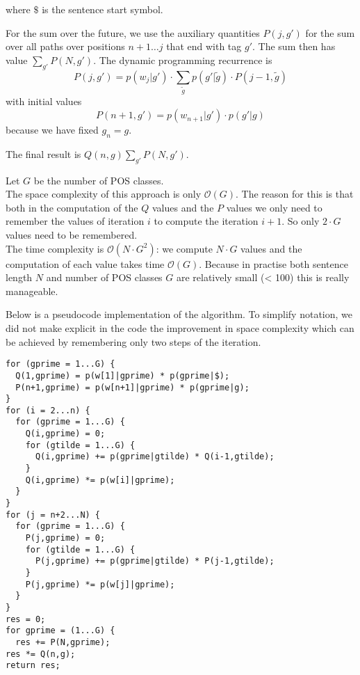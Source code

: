 \documentclass[%
   11pt,              %
   ngerman,           %
   a4paper,           %
   DIV11,             %
]{scrartcl}%
\begin{document}
where $\$ $ is the sentence start symbol. \par
For the sum over the future, we use the auxiliary quantities $P(j,g')$ for the sum over all paths over positions $n+1\ldots j$ that end with tag $g'$. The sum then has value $\sum_{g'} P(N,g')$. The dynamic programming recurrence is
\begin{equation*}
	P(j,g') = p(w_j|g') \cdot \sum_{\tilde{g}} p(g'|\tilde{g}) \cdot P(j-1,\tilde{g}) 
\end{equation*}
with initial values
\begin{equation*}
	P(n+1,g') = p(w_{n+1}|g') \cdot p(g'|g)
\end{equation*}
because we have fixed $g_n = g$. \par
The final result is $Q(n,g) \sum_{g'} P(N,g')$. \par
Let $G$ be the number of POS classes. \\ The space complexity of this approach is only $\mathcal{O}(G)$. The reason for this is that both in the computation of the $Q$ values and the $P$ values we only need to remember the values of iteration $i$ to compute the iteration $i+1$. So only $2 \cdot G$ values need to be remembered.\\
The time complexity is $\mathcal{O}(N \cdot G^2)$: we compute $N \cdot G$ values and the computation of each value takes time $\mathcal{O}(G)$. Because in practise both sentence length $N$ and number of POS classes $G$ are relatively small (< 100) this is really manageable. \par
Below is a pseudocode implementation of the algorithm. To simplify notation, we did not make explicit in the code the improvement in space complexity which can be achieved by remembering only two steps of the iteration.
\lstset{language=C, showstringspaces=false}
\begin{lstlisting}
for (gprime = 1...G) {
  Q(1,gprime) = p(w[1]|gprime) * p(gprime|$);
  P(n+1,gprime) = p(w[n+1]|gprime) * p(gprime|g);
}
for (i = 2...n) {
  for (gprime = 1...G) {
    Q(i,gprime) = 0;
	for (gtilde = 1...G) {
	  Q(i,gprime) += p(gprime|gtilde) * Q(i-1,gtilde);
	}
    Q(i,gprime) *= p(w[i]|gprime);
  }
}
for (j = n+2...N) {
  for (gprime = 1...G) {
	P(j,gprime) = 0;
	for (gtilde = 1...G) {
	  P(j,gprime) += p(gprime|gtilde) * P(j-1,gtilde);
	}
	P(j,gprime) *= p(w[j]|gprime);
  }
}
res = 0;
for gprime = (1...G) {
  res += P(N,gprime);
res *= Q(n,g);
return res;
\end{lstlisting}
\end{document}
